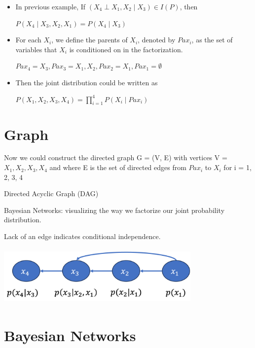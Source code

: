 \documentclass[11pt,a4paper]{report}
\begin{document}
\begin{itemize}
    \item In previous example, If $(X_{4} \perp X_{1}, X_{2} \mid X_{3}) \in I(P)$, then
    \begin{center}
        $P(X_{4} \mid X_{3}, X_{2}, X_{1}) = P(X_{4} \mid X_{3})$
    \end{center}

    \item For each $X_{i}$, we define the parents of $X_{i}$, denoted by $Pax_{i}$, as the set of variables that $X_{i}$ is conditioned on in the factorization.\\
    \begin{center}
    $Pax_{4} = {X_{3}}, Pax_{3} = {X_{1}, X_{2}}, Pax_{2} = {X_{1}, Pax_{1} = \emptyset}$
    \end{center}
    \item Then the joint distribution could be written as \\
    \begin{center}
        $P(X_{1}, X_{2}, X_{3}, X_{4}) = \prod_{i=1}^{4}P(X_{i} \mid Pax_{i})$
    \end{center}
\end{itemize}

\section{Graph}

Now we could construct the directed graph G = (V, E) with vertices V = ${X_{1}, X_{2}, X_{3}, X_{4}}$ and where E is the set of directed edges from $Pax_{i}$ to $X_{i}$ for i = 1, 2, 3, 4

Directed Acyclic Graph (DAG)

Bayesian Networks: visualizing the way we factorize our joint probability distribution.

Lack of an edge indicates conditional independence.
\begin{center}
    \includegraphics[width = 10cm, height = 3cm] {graph_vis.png}
\end{center}

\section{Bayesian Networks}
\end{document}
